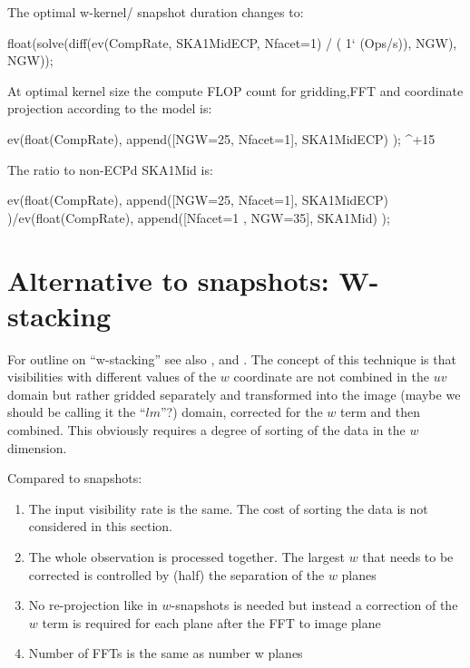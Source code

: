 \documentclass[useAMS,usenatbib,referee]{article}
\begin{document}
The optimal w-kernel/ snapshot duration changes to:

\begin{maxima}[]
  float(solve(diff(ev(CompRate, SKA1MidECP, Nfacet=1) / ( 1` (Ops/s)), NGW), NGW));
\maximaoutput*
\m  \left[ N_{\rm GW}=12.\,\left(1.7\,i-1.0\right) , N_{\rm GW}=-12.\,\left(1.7\,i+1.0\right) , N_{\rm GW}=25. \right] \\
\end{maxima}

At optimal kernel size the compute FLOP count for gridding,FFT and
coordinate projection according to the model is:
\begin{maxima}[]
ev(float(CompRate), append([NGW=25, Nfacet=1],  SKA1MidECP) );
\maximaoutput*
{} ^{+15} \\
\end{maxima}

The ratio to non-ECPd SKA1Mid is:
\begin{maxima}[]
ev(float(CompRate), append([NGW=25, Nfacet=1],  SKA1MidECP) )/ev(float(CompRate), append([Nfacet=1 , NGW=35],  SKA1Mid) );
\maximaoutput*
{} \\
\end{maxima}


\section{Alternative to snapshots: W-stacking}

For outline on ``w-stacking'' see also
\cite{VoronkovCalim2010Gridding}, and \cite{2013A&A...553A.105T}. The
concept of this technique is that visibilities with different values
of the $w$ coordinate are not combined in the $uv$ domain but rather
gridded separately and transformed into the image (maybe we should be
calling it the ``$lm$''?) domain, corrected for the $w$ term and then
combined. This obviously requires a degree of sorting of the data in
the $w$ dimension.

Compared to snapshots:
\begin{enumerate}
  \item The input visibility rate is the same. The cost of sorting the
    data is not considered in this section.
  \item The whole observation is processed together. The largest $w$
    that needs to be corrected is controlled by (half) the separation
    of the $w$ planes
  \item No re-projection like in $w$-snapshots is needed but instead a
    correction of the $w$ term is required for each plane after the
    FFT to image plane
  \item Number of FFTs is the same as number w planes
\end{enumerate}
\end{document}
